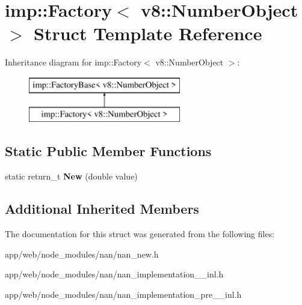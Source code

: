 \hypertarget{structimp_1_1_factory_3_01v8_1_1_number_object_01_4}{}\section{imp\+:\+:Factory$<$ v8\+:\+:Number\+Object $>$ Struct Template Reference}
\label{structimp_1_1_factory_3_01v8_1_1_number_object_01_4}
Inheritance diagram for imp\+:\+:Factory$<$ v8\+:\+:Number\+Object $>$\+:\begin{figure}[H]
\begin{center}
\leavevmode
\includegraphics[height=2.000000cm]{structimp_1_1_factory_3_01v8_1_1_number_object_01_4}
\end{center}
\end{figure}
\subsection*{Static Public Member Functions}
\begin{DoxyCompactItemize}
\item 
\mbox{\label{structimp_1_1_factory_3_01v8_1_1_number_object_01_4_ab979b25f2975c80d12de2099b1171d98}} 
static return\+\_\+t {\bfseries New} (double value)
\end{DoxyCompactItemize}
\subsection*{Additional Inherited Members}


The documentation for this struct was generated from the following files\+:\begin{DoxyCompactItemize}
\item 
app/web/node\+\_\+modules/nan/nan\+\_\+new.\+h\item 
app/web/node\+\_\+modules/nan/nan\+\_\+implementation\+\_\+\_\+inl.\+h\item 
app/web/node\+\_\+modules/nan/nan\+\_\+implementation\+\_\+pre\+\_\+\_\+inl.\+h\end{DoxyCompactItemize}
